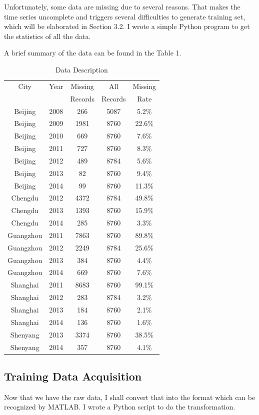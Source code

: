\documentclass{sig-alternate}
\begin{document}
Unfortunately, some data are missing due to several reasons. That makes the time series uncomplete and triggers several difficulties to generate training set, which will be elaborated in Section 3.2. I wrote a simple Python program to get the statistics of all the data.

A brief summary of the data can be found in the Table 1.

\begin{table}[ht]
\centering
\caption{Data Description}
\begin{tabular}{|c|c|c|c|c|}  \hline
City&Year&Missing&All&Missing \\
&&Records&Records&Rate\\ \hline
Beijing&2008&266&5087&5.2\% \\ \hline
Beijing&2009&1981&8760&22.6\% \\ \hline
Beijing&2010&669&8760&7.6\% \\ \hline
Beijing&2011&727&8760&8.3\% \\ \hline
Beijing&2012&489&8784&5.6\% \\ \hline
Beijing&2013&82&8760&9.4\% \\ \hline
Beijing&2014&99&8760&11.3\% \\ \hline \hline
Chengdu&2012&4372&8784&49.8\% \\ \hline
Chengdu&2013&1393&8760&15.9\% \\ \hline
Chengdu&2014&285&8760&3.3\% \\ \hline \hline
Guangzhou&2011&7863&8760&89.8\% \\ \hline
Guangzhou&2012&2249&8784&25.6\% \\ \hline
Guangzhou&2013&384&8760&4.4\% \\ \hline
Guangzhou&2014&669&8760&7.6\% \\ \hline \hline
Shanghai&2011&8683&8760&99.1\% \\ \hline
Shanghai&2012&283&8784&3.2\% \\ \hline
Shanghai&2013&184&8760&2.1\% \\ \hline
Shanghai&2014&136&8760&1.6\% \\ \hline \hline
Shenyang&2013&3374&8760&38.5\% \\ \hline
Shenyang&2014&357&8760&4.1\% \\ \hline \hline
\end{tabular}
\end{table}

\subsection{Training Data Acquisition}
Now that we have the raw data, I shall convert that into the format which can be recognized by MATLAB. I wrote a Python script to do the transformation.
\end{document}
